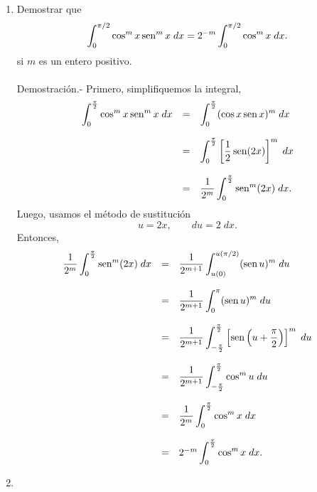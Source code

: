 \begin{enumerate}[\bfseries 1.]
	\item Demostrar que
	$$\int_0^{\pi/2}\cos^m x\mathop{\mbox{\normalfont sen}}\nolimits^m x\; dx = 2^{-m}\int_0^{\pi/2}\cos^m x\; dx.$$
	si $m$ es un entero positivo.\\\\
	    Demostración.-\; Primero, simplifiquemos la integral,
	    $$\begin{array}{rcl}
		\displaystyle \int_0^{\frac{\pi}{2}} \cos^m x \mathop{\mbox{\normalfont sen}}\nolimits^m x\; dx &=& \displaystyle\int_0^{\frac{\pi}{2}} (\cos x \mathop{\mbox{\normalfont sen}}\nolimits x)^m \; dx\\\\
									    &=&\displaystyle\int_0^{\frac{\pi}{2}} \left[\dfrac{1}{2}\mathop{\mbox{\normalfont sen}}\nolimits(2x)\right]^m\; dx\\\\
									    &=&\dfrac{1}{2^m}\displaystyle\int_0^{\frac{\pi}{2}} \mathop{\mbox{\normalfont sen}}\nolimits^m(2x)\; dx.
	    \end{array}$$
	    Luego, usamos el método de sustitución 
	    $$u=2x,\qquad du=2\; dx.$$
	    Entonces,
	    $$\begin{array}{rcl}
		\dfrac{1}{2^m}\displaystyle\int_0^{\frac{\pi}{2}} \mathop{\mbox{\normalfont sen}}\nolimits^m (2x)\; dx &=& \dfrac{1}{2^{m+1}} \displaystyle\int_{u(0)}^{u(\pi/2)} (\mathop{\mbox{\normalfont sen}}\nolimits u)^m \; du\\\\
										   &=& \dfrac{1}{2^{m+1}}\displaystyle \int_0^\pi (\mathop{\mbox{\normalfont sen}}\nolimits u)^m \; du\\\\
										   &=& \dfrac{1}{2^{m+1}} \displaystyle\int_{-\frac{\pi}{2}}^{\frac{\pi}{2}} \left[\mathop{\mbox{\normalfont sen}}\nolimits\left(u+\dfrac{\pi}{2}\right)\right]^m\; du\\\\
										   &=&\dfrac{1}{2^{m+1}} \displaystyle\int_{-\frac{\pi}{2}}^{\frac{\pi}{2}} \cos^m u\; du\\\\
										   &=&\dfrac{1}{2^m}\displaystyle\int_0^{\frac{\pi}{2}}\cos^m x\; dx\\\\
										   &=&2^{-m}\displaystyle\int_0^{\frac{\pi}{2}}\cos^m x\; dx.
	    \end{array}$$
	    \vspace{.5cm}
	    \vspace{.5cm}


	\item 
	    \begin{enumerate}[(a)]


\end{enumerate}
\end{enumerate}
